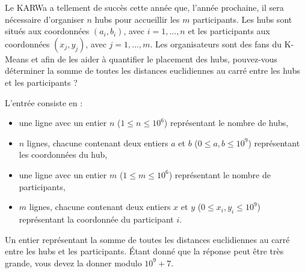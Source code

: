 \problemname{\problemyamlname}


\newcommand{\maxa}{123456789}

Le KARWa a tellement de succès cette année que, l'année prochaine, il sera nécessaire d'organiser $n$ hubs pour
accueillir les $m$ participants. Les hubs sont situés aux coordonnées $(a_i , b_i )$, avec $i = 1, ..., n$ et les participants aux coordonnées $(x_j , y_j )$, avec $j = 1, ..., m$.
Les organisateurs sont des fans du K-Means et afin de les aider à quantifier le placement des hubs, pouvez-vous
déterminer la somme de toutes les distances euclidiennes au carré entre les hubs et les participants ?
\begin{Input}
    L'entrée consiste en :
    \begin{itemize}
      \item une ligne avec un entier $n$ ($1 \leq n \leq 10^{6}$) représentant le nombre de hubs,
      \item $n$ lignes, chacune contenant deux entiers $a$ et $b$ ($0 \leq a, b\leq 10^{9}$) représentant les coordonnées du hub,
      \item une ligne avec un entier $m$ ($1 \leq m \leq 10^{6}$)  représentant le nombre de participants,
      \item $m$ lignes, chacune contenant deux entiers $x$ et $y$ ($0 \leq x_i, y_i\leq 10^{9}$) représentant la coordonnée du participant $i$.
    \end{itemize}
\end{Input}

\begin{Output}
Un entier représentant la somme de toutes les distances euclidiennes au carré entre les hubs et les participants. Étant donné que la réponse peut être très grande, vous devez la donner modulo $10^9 + 7$.
\end{Output}
